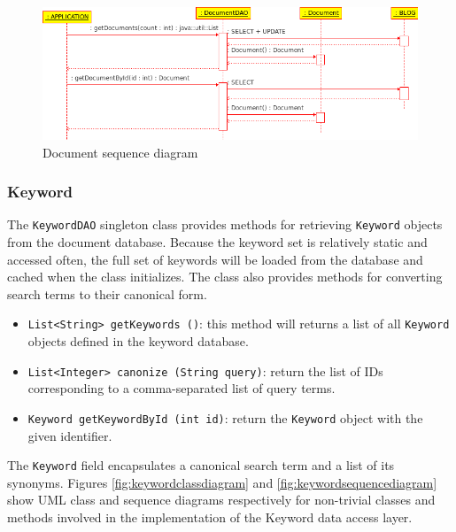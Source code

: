 \documentclass[10pt]{report}
\begin{document}
\begin{figure}
  \begin{center}
        \includegraphics[width=\textwidth,height=!]{documentsequencediagram}
  \end{center}
  \caption{Document sequence diagram}
  \label{fig:documentsequencediagram}
\end{figure} 


\subsubsection{Keyword}
The \texttt{KeywordDAO} singleton class provides methods for
retrieving \texttt{Keyword} objects from the document
database. Because the keyword set is relatively static and accessed
often, the full set of keywords will be loaded from the database and
cached when the class initializes. The class also provides methods for
converting search terms to their canonical form.

\begin{itemize}
\item \texttt{List<String> getKeywords ()}: this method
  will returns a list of all \texttt{Keyword} objects defined in the
  keyword database. 

\item \texttt{List<Integer> canonize (String query)}: return the list
  of IDs corresponding to a comma-separated list of query terms.

\item \texttt{Keyword getKeywordById (int id)}: return the
  \texttt{Keyword} object with the given identifier.
\end{itemize}

The \texttt{Keyword} field encapsulates a canonical search term and a
list of its synonyms. Figures \ref{fig:keywordclassdiagram} and
\ref{fig:keywordsequencediagram} show UML class and sequence diagrams
respectively for non-trivial classes and methods involved in the
implementation of the Keyword data access layer. 
\end{document}
